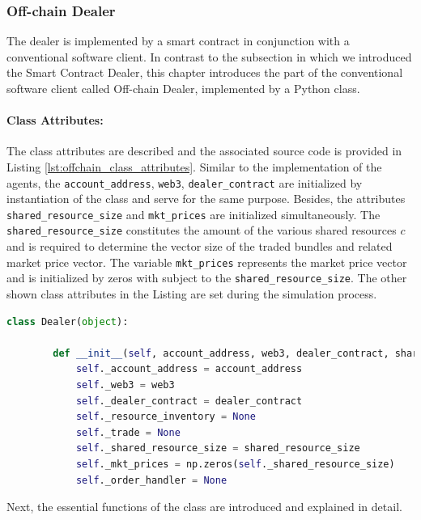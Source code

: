 \subsubsection{Off-chain Dealer}
\label{sec:off_chain_component}
The dealer is implemented by a smart contract in conjunction with 
a conventional software client. 
In contrast to the subsection in which we introduced the Smart Contract Dealer, 
this chapter introduces the part of the conventional software client called Off-chain Dealer,
implemented by a Python class.

\paragraph{Class Attributes:} The class attributes are described and the associated source code
is provided in Listing \ref{lst:offchain_class_attributes}.
Similar to the implementation of the agents, the \verb|account_address|, \verb|web3|, 
\verb|dealer_contract| are initialized by instantiation of the class and serve for 
the same purpose. Besides, the attributes \verb|shared_resource_size| and \verb|mkt_prices|
are initialized simultaneously. The \verb|shared_resource_size| constitutes the amount 
of the various shared resources $c$ and is required to determine the vector size 
of the traded bundles and related market price vector. 
The variable \verb|mkt_prices| represents the market price vector and is initialized by zeros with subject to
the \verb|shared_resource_size|. The other shown class attributes in the Listing are set during the
simulation process.

\begin{lstlisting}[float=htbp, label=lst:offchain_class_attributes, caption=Class Attributes of Off-chain Dealer, language=Python]
    class Dealer(object):

        def __init__(self, account_address, web3, dealer_contract, shared_resource_size):
            self._account_address = account_address
            self._web3 = web3
            self._dealer_contract = dealer_contract
            self._resource_inventory = None
            self._trade = None
            self._shared_resource_size = shared_resource_size
            self._mkt_prices = np.zeros(self._shared_resource_size)
            self._order_handler = None
\end{lstlisting}

Next, the essential functions of the class are introduced and explained in detail.\\

